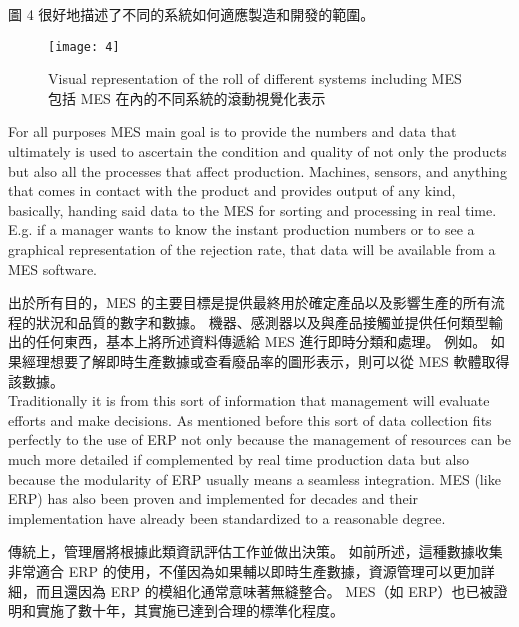 \fontsize{14pt}{5pt}\sectionef
 {圖 4 很好地描述了不同的系統如何適應製造和開發的範圍。}\\[15pt]
\newpage

\begin{figure}[hbt!]
\begin{center}
\texttt{[image: 4]}
\caption{\small Visual representation of the roll of different systems including MES\\
 包括 MES 在內的不同系統的滾動視覺化表示}\label{fig.4}
\end{center}
\end{figure}

\fontsize{14pt}{2.5pt}\sectionef 
{For all purposes MES main goal is to provide the numbers and data that ultimately is used to ascertain the condition and quality of not only the products but also all the processes that affect production. Machines, sensors, and anything that comes in contact with the product and provides output of any kind, basically, handing said data to the MES for sorting and processing in real time. E.g. if a manager wants to know the instant production numbers or to see a graphical representation of the rejection rate, that data will be available from a MES software.}

\fontsize{14pt}{5pt}\sectionef
 {出於所有目的，MES 的主要目標是提供最終用於確定產品以及影響生產的所有流程的狀況和品質的數字和數據。 機器、感測器以及與產品接觸並提供任何類型輸出的任何東西，基本上將所述資料傳遞給 MES 進行即時分類和處理。 例如。 如果經理想要了解即時生產數據或查看廢品率的圖形表示，則可以從 MES 軟體取得該數據。}\\[15pt]

\fontsize{14pt}{2.5pt}\sectionef 
{Traditionally it is from this sort of information that management will evaluate efforts and make decisions. As mentioned before this sort of data collection fits perfectly to the use of ERP not only because the management of resources can be much more detailed if complemented by real time production data but also because the modularity of ERP usually means a seamless integration. MES (like ERP) has also been proven and implemented for decades and their implementation have already been standardized to a reasonable degree.
}

\fontsize{14pt}{5pt}\sectionef
 {傳統上，管理層將根據此類資訊評估工作並做出決策。 如前所述，這種數據收集非常適合 ERP 的使用，不僅因為如果輔以即時生產數據，資源管理可以更加詳細，而且還因為 ERP 的模組化通常意味著無縫整合。 MES（如 ERP）也已被證明和實施了數十年，其實施已達到合理的標準化程度。}\\[15pt]
\newpage



